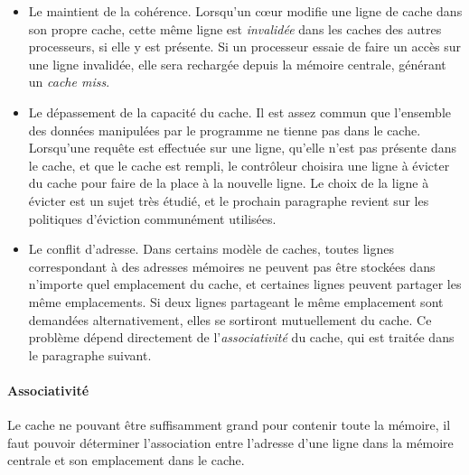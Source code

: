 \begin{itemize}
  \item Le maintient de la cohérence. Lorsqu'un cœur modifie une ligne de cache dans son propre cache, cette même ligne est \emph{invalidée} dans les caches des autres processeurs, si elle y est présente.
Si un processeur essaie de faire un accès sur une ligne invalidée, elle sera rechargée depuis la mémoire centrale, générant un \emph{cache miss}.
  \item Le dépassement de la capacité du cache. Il est assez commun que l'ensemble des données manipulées par le programme ne tienne pas dans le cache.
Lorsqu'une requête est effectuée sur une ligne, qu'elle n'est pas présente dans le cache, et que le cache est rempli, le contrôleur choisira une ligne à évicter du cache pour faire de la place à la nouvelle ligne.
Le choix de la ligne à évicter est un sujet très étudié, et le prochain paragraphe revient sur les politiques d'éviction communément utilisées.
  \item Le conflit d'adresse. Dans certains modèle de caches, toutes lignes correspondant à des adresses mémoires ne peuvent pas être stockées dans n'importe quel emplacement du cache, et certaines lignes peuvent partager les même emplacements.
    Si deux lignes partageant le même emplacement sont demandées alternativement, elles se sortiront mutuellement du cache.
    Ce problème dépend directement de l'\emph{associativité} du cache, qui est traitée dans le paragraphe suivant.
\end{itemize}



\paragraph{Associativité}

Le cache ne pouvant être suffisamment grand pour contenir toute la mémoire, il faut pouvoir déterminer l'association entre l'adresse d'une ligne dans la mémoire centrale et son emplacement dans le cache.

